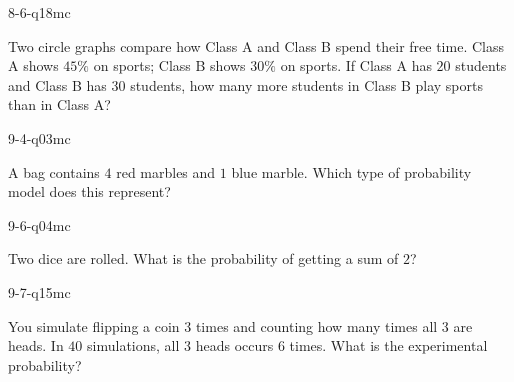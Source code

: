 \begin{practiceQuestion}{8-6-q18}{mc}
\begin{questionText}
Two circle graphs compare how Class A and Class B spend their free time. Class A shows $45\%$ on sports; Class B shows $30\%$ on sports. If Class A has $20$ students and Class B has $30$ students, how many more students in Class B play sports than in Class A?
\end{questionText}
\end{practiceQuestion}

\begin{practiceQuestion}{9-4-q03}{mc}
\begin{questionText}
A bag contains $4$ red marbles and $1$ blue marble. Which type of probability model does this represent?
\end{questionText}
\end{practiceQuestion}

\begin{practiceQuestion}{9-6-q04}{mc}
\begin{questionText}
Two dice are rolled. What is the probability of getting a sum of $2$?
\end{questionText}
\end{practiceQuestion}

\begin{practiceQuestion}{9-7-q15}{mc}
\begin{questionText}
You simulate flipping a coin $3$ times and counting how many times all $3$ are heads. In $40$ simulations, all $3$ heads occurs $6$ times. What is the experimental probability?
\end{questionText}
\end{practiceQuestion}
